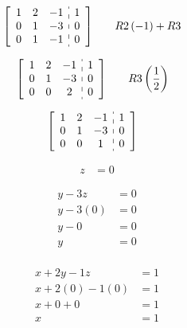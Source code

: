 \documentclass[fleqn]{article}
\begin{document}
    \begin{alignat*}{2}
      &\left[
        \begin{array}{ccc:c}
          1 & 2 & -1 & 1 \\
          0 & 1 & -3 & 0 \\
          0 & 1 & -1 & 0
        \end{array}
      \right]
      \quad
      && R2\left(-1\right)+R3
    \end{alignat*}

    \begin{alignat*}{2}
      &\left[
        \begin{array}{ccc:c}
          1 & 2 & -1 & 1 \\
          0 & 1 & -3 & 0 \\
          0 & 0 & 2 & 0
        \end{array}
      \right]
      \quad
      && R3\left(\frac{1}{2}\right)
    \end{alignat*}

    \begin{alignat*}{2}
      &\left[
        \begin{array}{ccc:c}
          1 & 2 & -1 & 1 \\
          0 & 1 & -3 & 0 \\
          0 & 0 & 1 & 0 \\
        \end{array}
      \right]
    \end{alignat*}
    
    \begin{align*}
      z &= 0
    \end{align*}

    \begin{align*}
      y -3z &= 0 \\
      y -3(0) &= 0 \\
      y - 0 &= 0 \\
      y &= 0 \\
    \end{align*}

    \begin{align*}
      x + 2y -1z &= 1 \\
      x + 2(0) -1(0) &= 1 \\
      x + 0 + 0 &= 1 \\
      x &= 1
    \end{align*}
\end{document}
